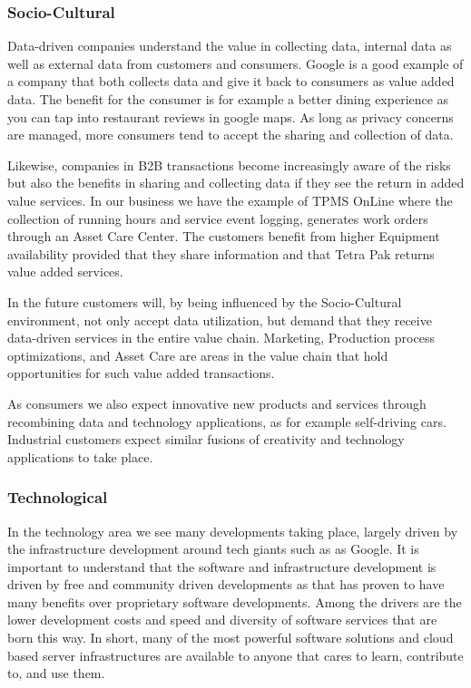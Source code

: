 \documentclass[10pt]{article} %
\begin{document}
\subsubsection{Socio-Cultural}
Data-driven companies understand the value in collecting data, internal data as well as external data from customers and consumers. Google is a good example of a company that both collects data and give it back to consumers as value added data. The benefit for the consumer is for example a better dining experience as you can tap into restaurant reviews in google maps. As long as privacy concerns are managed, more consumers tend to accept the sharing and collection of data.

Likewise, companies in B2B transactions become increasingly aware of the risks but also the benefits in sharing and collecting data if they see the return in added value services. In our business we have the example of TPMS OnLine where the collection of running hours and service event logging, generates work orders through an Asset Care Center. The customers benefit from higher Equipment availability provided that they share information and that Tetra Pak returns value added services. 

In the future customers will, by being influenced by the Socio-Cultural environment, not only accept data utilization, but demand that they receive data-driven services in the entire value chain. Marketing, Production process optimizations, and Asset Care are areas in the value chain that hold opportunities for such value added transactions.

As consumers we also expect innovative new products and services through recombining data and technology applications, as for example self-driving cars. Industrial customers expect similar fusions of creativity and technology applications to take place.

\subsubsection{Technological}
In the technology area we see many developments taking place, largely driven by the infrastructure development around tech giants such as as Google. It is important to understand that the software and infrastructure development is driven by free and community driven developments as that has proven to have many benefits over proprietary software developments. Among the drivers are the lower development costs and speed and diversity of software services that are born this way. In short, many of the most powerful software solutions and cloud based server infrastructures are available to anyone that cares to learn, contribute to, and use them.
\end{document}

